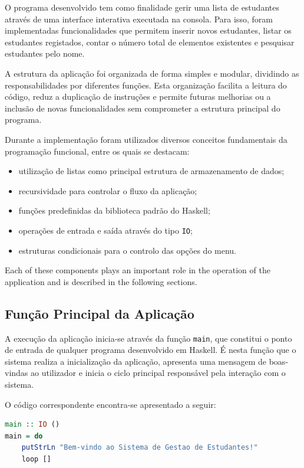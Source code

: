 \documentclass[12pt,a4paper]{article}
\begin{document}
O programa desenvolvido tem como finalidade gerir uma lista de estudantes através de uma interface interativa executada na consola. Para isso, foram implementadas funcionalidades que permitem inserir novos estudantes, listar os estudantes registados, contar o número total de elementos existentes e pesquisar estudantes pelo nome.

A estrutura da aplicação foi organizada de forma simples e modular, dividindo as responsabilidades por diferentes funções. Esta organização facilita a leitura do código, reduz a duplicação de instruções e permite futuras melhorias ou a inclusão de novas funcionalidades sem comprometer a estrutura principal do programa.

Durante a implementação foram utilizados diversos conceitos fundamentais da programação funcional, entre os quais se destacam:
\begin{itemize}
    \item utilização de listas como principal estrutura de armazenamento de dados;
    \item recursividade para controlar o fluxo da aplicação;
    \item funções predefinidas da biblioteca padrão do Haskell;
    \item operações de entrada e saída através do tipo \texttt{IO};
    \item estruturas condicionais para o controlo das opções do menu.
\end{itemize}

Each of these components plays an important role in the operation of the application and is described in the following sections.

\subsection{Função Principal da Aplicação}
A execução da aplicação inicia-se através da função \texttt{main}, que constitui o ponto de entrada de qualquer programa desenvolvido em Haskell. É nesta função que o sistema realiza a inicialização da aplicação, apresenta uma mensagem de boas-vindas ao utilizador e inicia o ciclo principal responsável pela interação com o sistema.

O código correspondente encontra-se apresentado a seguir:
\begin{lstlisting}[language=Haskell]
main :: IO ()
main = do
    putStrLn "Bem-vindo ao Sistema de Gestao de Estudantes!"
    loop []
\end{lstlisting}
\end{document}
